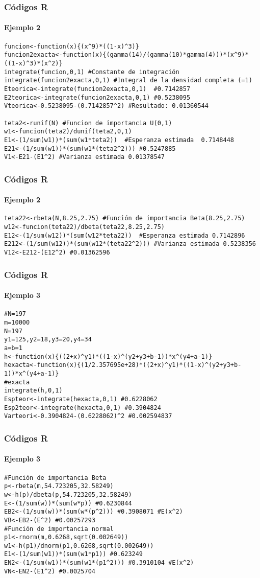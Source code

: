 \documentclass[12pt]{beamer}
\begin{document}
\begin{frame}[fragile]
\frametitle{Códigos R}
\framesubtitle{Ejemplo 2}
\begin{verbatim}
funcion<-function(x){(x^9)*((1-x)^3)}
funcion2exacta<-function(x){(gamma(14)/(gamma(10)*gamma(4)))*(x^9)*((1-x)^3)*(x^2)} 
integrate(funcion,0,1) #Constante de integración
integrate(funcion2exacta,0,1) #Integral de la densidad completa (=1)
Eteorica<-integrate(funcion2exacta,0,1)  #0.7142857
E2teorica<-integrate(funcion2exacta,0,1) #0.5238095
Vteorica<-0.5238095-(0.7142857^2) #Resultado: 0.01360544

teta2<-runif(N) #Funcion de importancia U(0,1)
w1<-funcion(teta2)/dunif(teta2,0,1)
E1<-(1/sum(w1))*(sum(w1*teta2))  #Esperanza estimada  0.7148448
E21<-(1/sum(w1))*(sum(w1*(teta2^2))) #0.5247885
V1<-E21-(E1^2) #Varianza estimada 0.01378547
\end{verbatim}
\end{frame}

\begin{frame}[fragile]
\frametitle{Códigos R}
\framesubtitle{Ejemplo 2}
\begin{verbatim}
teta22<-rbeta(N,8.25,2.75) #Función de importancia Beta(8.25,2.75)
w12<-funcion(teta22)/dbeta(teta22,8.25,2.75)
E12<-(1/sum(w12))*(sum(w12*teta22))  #Esperanza estimada 0.7142896
E212<-(1/sum(w12))*(sum(w12*(teta22^2))) #Varianza estimada 0.5238356
V12<-E212-(E12^2) #0.01362596
\end{verbatim}
\end{frame}

\begin{frame}[fragile]
\frametitle{Códigos R}
\framesubtitle{Ejemplo 3}
\begin{verbatim}
#N=197
m=10000
N=197
y1=125,y2=18,y3=20,y4=34
a=b=1
h<-function(x){((2+x)^y1)*((1-x)^(y2+y3+b-1))*x^(y4+a-1)}
hexacta<-function(x){(1/2.357695e+28)*((2+x)^y1)*((1-x)^(y2+y3+b-1))*x^(y4+a-1)}
#exacta
integrate(h,0,1)
Espteor<-integrate(hexacta,0,1) #0.6228062
Esp2teor<-integrate(hexacta,0,1) #0.3904824
Varteori<-0.3904824-(0.6228062)^2 #0.002594837

\end{verbatim}
\end{frame}

\begin{frame}[fragile]
\frametitle{Códigos R}
\framesubtitle{Ejemplo 3}
\begin{verbatim}
#Función de importancia Beta
p<-rbeta(m,54.723205,32.58249)
w<-h(p)/dbeta(p,54.723205,32.58249)
E<-(1/sum(w))*(sum(w*p)) #0.6230844
EB2<-(1/sum(w))*(sum(w*(p^2))) #0.3908071 #E(x^2)
VB<-EB2-(E^2) #0.00257293
#Función de importancia normal
p1<-rnorm(m,0.6268,sqrt(0.002649))
w1<-h(p1)/dnorm(p1,0.6268,sqrt(0.002649))
E1<-(1/sum(w1))*(sum(w1*p1)) #0.623249
EN2<-(1/sum(w1))*(sum(w1*(p1^2))) #0.3910104 #E(x^2)
VN<-EN2-(E1^2) #0.0025704
\end{verbatim}
\end{frame}
\end{document}

